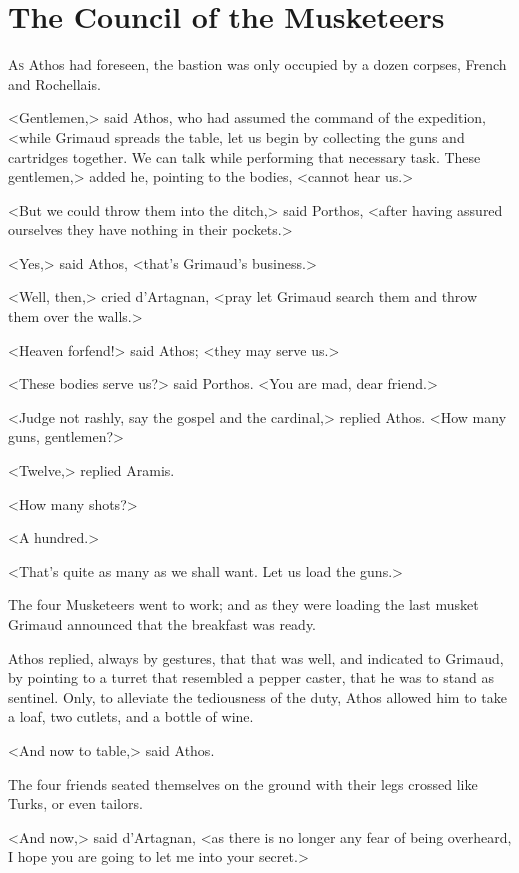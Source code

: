 
\chapter{The Council of the Musketeers}

\lettrine[]{A}{s} Athos had foreseen, the bastion was only occupied by a dozen corpses, French and Rochellais. 

\zz
<Gentlemen,> said Athos, who had assumed the command of the expedition, <while Grimaud spreads the table, let us begin by collecting the guns and cartridges together. We can talk while performing that necessary task. These gentlemen,> added he, pointing to the bodies, <cannot hear us.> 

<But we could throw them into the ditch,> said Porthos, <after having assured ourselves they have nothing in their pockets.> 

<Yes,> said Athos, <that's Grimaud's business.> 

<Well, then,> cried d'Artagnan, <pray let Grimaud search them and throw them over the walls.> 

<Heaven forfend!> said Athos; <they may serve us.> 

<These bodies serve us?> said Porthos. <You are mad, dear friend.> 

<Judge not rashly, say the gospel and the cardinal,> replied Athos. <How many guns, gentlemen?> 

<Twelve,> replied Aramis. 

<How many shots?> 

<A hundred.> 

<That's quite as many as we shall want. Let us load the guns.> 

The four Musketeers went to work; and as they were loading the last musket Grimaud announced that the breakfast was ready. 

Athos replied, always by gestures, that that was well, and indicated to Grimaud, by pointing to a turret that resembled a pepper caster, that he was to stand as sentinel. Only, to alleviate the tediousness of the duty, Athos allowed him to take a loaf, two cutlets, and a bottle of wine. 

<And now to table,> said Athos. 

The four friends seated themselves on the ground with their legs crossed like Turks, or even tailors. 

<And now,> said d'Artagnan, <as there is no longer any fear of being overheard, I hope you are going to let me into your secret.> 

